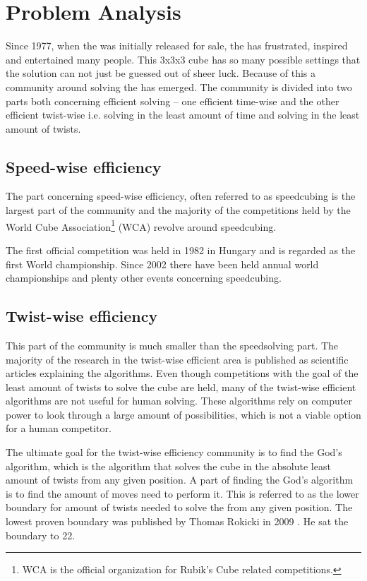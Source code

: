 \chapter{Problem Analysis}
Since 1977, when the \rubik{} was initially released for sale, the \rubik{} has frustrated, inspired and entertained many people. This 3x3x3 cube has so many possible settings that the solution can not just be guessed out of sheer luck. Because of this a community around solving the \rubik{} has emerged. The community is divided into two parts both concerning efficient solving -- one efficient time-wise and the other efficient twist-wise i.e. solving in the least amount of time and solving in the least amount of twists. 

\section{Speed-wise efficiency}
The part concerning speed-wise efficiency, often referred to as speedcubing is the largest part of the community and the majority of the competitions held by the World Cube Association\footnote{WCA is the official organization for Rubik's Cube related competitions.} (WCA)\cite{wca} revolve around speedcubing.

The first official competition was held in 1982 in Hungary and is regarded as the first World championship. Since 2002 there have been held annual world championships and plenty other events concerning speedcubing. 


\section{Twist-wise efficiency}
This part of the community is much smaller than the speedsolving part. The majority of the research in the twist-wise efficient area is published as scientific articles explaining the algorithms. Even though competitions with the goal of the least amount of twists to solve the cube are held, many of the twist-wise efficient algorithms are not useful for human solving. These algorithms rely on computer power to look through a large amount of possibilities, which is not a viable option for a human competitor. 

The ultimate goal for the twist-wise efficiency community is to find the God's algorithm, which is the algorithm that solves the cube in the absolute least amount of twists from any given position. A part of finding the God's algorithm is to find the amount of moves need to perform it. This is referred to as the lower boundary for amount of twists needed to solve the \rubik{} from any given position. The lowest proven boundary was published by Thomas Rokicki in 2009 \cite{rokicki09}. He sat the boundary to 22.  


